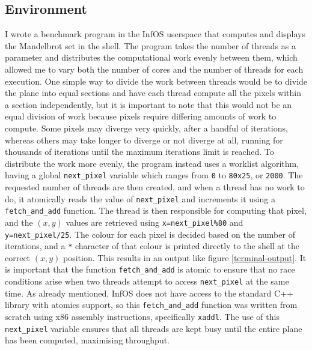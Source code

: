 \documentclass[bsc,frontabs,singlespacing,parskip,deptreport]{infthesis}
\begin{document}
\subsection{Environment} 
I wrote a benchmark program in the InfOS userspace that computes and displays the Mandelbrot set in the shell. The program takes the number of threads as a parameter and distributes the computational work evenly between them, which allowed me to vary both the number of cores and the number of threads for each execution. One simple way to divide the work between threads would be to divide the plane into equal sections and have each thread compute all the pixels within a section independently, but it is important to note that this would not be an equal division of work because pixels require differing amounts of work to compute. Some pixels may diverge very quickly, after a handful of iterations, whereas others may take longer to diverge or not diverge at all, running for thousands of iterations until the maximum iterations limit is reached. To distribute the work more evenly, the program instead uses a worklist algorithm, having a global \verb|next_pixel| variable which ranges from \verb|0| to \verb|80x25|, or \verb|2000|. The requested number of threads are then created, and when a thread has no work to do, it atomically reads the value of \verb|next_pixel| and increments it using a \verb|fetch_and_add| function. The thread is then responsible for computing that pixel, and the $(x,y)$ values are retrieved using \verb|x=next_pixel%80| and \verb|y=next_pixel/25|. The colour for each pixel is decided based on the number of iterations, and a \verb|*| character of that colour is printed directly to the shell at the correct $(x,y)$ position. This results in an output like figure \ref{terminal-output}. It is important that the function \verb|fetch_and_add| is atomic to ensure that no race conditions arise when two threads attempt to access \verb|next_pixel| at the same time. As already mentioned, InfOS does not have access to the standard C++ library with atomics support, so this \verb|fetch_and_add| function was written from scratch using x86 assembly instructions, specifically \verb|xaddl|. The use of this \verb|next_pixel| variable ensures that all threads are kept busy until the entire plane has been computed, maximising throughput.
\end{document}
